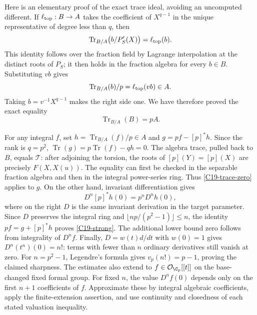 \documentclass[11pt]{article}
\theoremstyle{definition}\newtheorem{definition}[theorem]{Definition}\newtheorem{remark}[theorem]{Remark}
\begin{document}
Here is an elementary proof of the exact trace ideal, avoiding
an uncomputed different.  If $\ell_{
\rm top}:B\to A$ takes the coefficient of $X^{q-1}$ in the
unique representative of degree less than $q$, then
\[
 \operatorname{Tr}_{B/A}\bigl(b/P_S'(X)\bigr)
      =\ell_{\rm top}(b).
\]
This identity follows over the fraction field by Lagrange
interpolation at the distinct roots of $P_S$; it then holds
in the fraction algebra for every $b\in B$.
Substituting $vb$ gives
\[
 \operatorname{Tr}_{B/A}(b)/p=\ell_{\rm top}(vb)\in A.
\]
Taking $b=v^{-1}X^{q-1}$ makes the right side one.
We have therefore proved the exact equality
\begin{equation}\label{C19-trace-ideal}
 \operatorname{Tr}_{B/A}(B)=pA.
\end{equation}

For any integral $f$, set
$h=\operatorname{Tr}_{B/A}(f)/p\in A$ and
$g=pf-[p]^*h$.  Since the rank is $q=p^2$,
$\operatorname{Tr}(g)=p\operatorname{Tr}(f)-qh=0$.
The algebra trace, pulled back to $B$, equals $\mathcal T$:
after adjoining the torsion, the roots of
$[p](Y)=[p](X)$ are precisely $F(X,X(u))$.
The equality can first be checked in the separable fraction
algebra and then in the integral power-series ring.
Thus \eqref{C19-trace-zero} applies to $g$.
On the other hand, invariant differentiation gives
\[
 D^n[p]^*h(0)=p^nD^nh(0),
\]
where on the right $D$ is the same invariant derivation in the
target parameter.  Since $D$ preserves the integral ring and
$\lfloor np/(p^2-1)\rfloor\leq n$, the identity
$pf=g+[p]^*h$ proves \eqref{C19-strong}.
The additional lower bound zero follows from integrality of
$D^nf$.  Finally, $D=w(t)d/dt$ with $w(0)=1$ gives
$D^n(t^n)(0)=n!$: terms with fewer than $n$ ordinary derivatives
still vanish at zero.  For $n=p^2-1$, Legendre's formula gives
$v_p(n!)=p-1$, proving the claimed sharpness.
The estimates also extend to $f\in\mathcal O_{\C_p}[[t]]$
on the base-changed fixed formal group.  For fixed $n$, the
value $D^nf(0)$ depends only on the first $n+1$ coefficients
of $f$.  Approximate these by integral algebraic coefficients,
apply the finite-extension assertion, and use continuity and
closedness of each stated valuation inequality.
\end{document}
